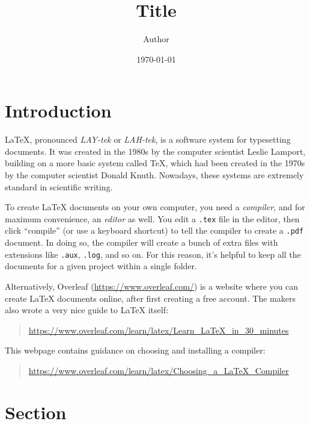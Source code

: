 \documentclass[a4paper,10pt,leqno]{article}
\numberwithin{equation}{section}
\theoremstyle{plain}
\theoremstyle{definition}
\theoremstyle{remark}
\begin{document}
\title{Title}
\author{Author}
\date{\today} %
\maketitle

\thispagestyle{empty}



\section{Introduction}

\LaTeX{}, pronounced \emph{LAY-tek} or \emph{LAH-tek}, is a software system for typesetting documents.
It was created in the 1980s by the computer scientist Leslie Lamport, building on a more basic system called \TeX{}, which had been created in the 1970s by the computer scientist Donald Knuth.
Nowadays, these systems are extremely standard in scientific writing.

To create \LaTeX{} documents on your own computer, you need a \emph{compiler}, and for maximum convenience, an \emph{editor} as well.
You edit a \texttt{.tex} file in the editor, then click ``compile'' (or use a keyboard shortcut) to tell the compiler to create a \texttt{.pdf} document.
In doing so, the compiler will create a bunch of extra files with extensions like \texttt{.aux}, \texttt{.log}, and so on.
For this reason, it's helpful to keep all the documents for a given project within a single folder.

Alternatively, Overleaf (\url{https://www.overleaf.com/}) is a website where you can create \LaTeX{} documents online, after first creating a free account.
The makers also wrote a very nice guide to \LaTeX{} itself:
\begin{quote}  \url{https://www.overleaf.com/learn/latex/Learn_LaTeX_in_30_minutes}
\end{quote}
This webpage contains guidance on choosing and installing a compiler:
\begin{quote}
\url{https://www.overleaf.com/learn/latex/Choosing_a_LaTeX_Compiler}
\end{quote}

\section{Section}
\end{document}

